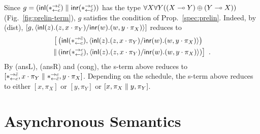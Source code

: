 \begin{example}
 \label{spec-ex}
 Since $g = (\inl{\comodL}\conc\inr{\comodR})$ has the type
 $\forall X\forall Y((X\limp Y)\oplus (Y\limp X))$ (Fig.~\ref{fig:prelin-term}),
 $g$ satisfies the condition of Prop.~\ref{spec:prelin}.
 Indeed, by (dist),
 $\left[g, \mats{z}{z}{x\cdot\pi_Y}{w}{w}{y\cdot\pi_X}\right]$
 reduces to
 \begin{align*}
  \bigl[& \left(\inl{\comodL},
  \mats{z}{z}{x\cdot\pi_Y}{w}{w}{y\cdot\pi_X}\right) \\ \conc
  & \left(\inr{\comodR}, \mats{z}{z}{x\cdot\pi_Y}{w}{w}{y\cdot\pi_X}\right)\bigr]\enspace.
 \end{align*}
 By (ansL), (ansR) and (cong), the s-term above reduces to
 $[\comodL, x\cdot\pi_Y\conc \comodR,y\cdot\pi_X]$.
 Depending on the schedule,  the s-term above reduces to either
 $[x,\pi_X]$ or $[y,\pi_Y]$ or $[x,\pi_X\conc y,\pi_Y]$.
\end{example}




\section{Asynchronous Semantics}
\label{sec:async}

